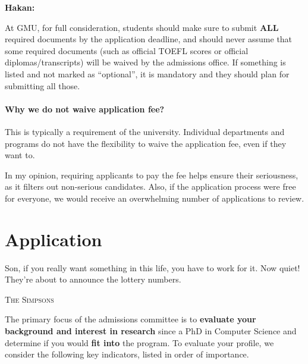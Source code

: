 \documentclass[11pt]{article}
\newenvironment{commentbox}[1][]{
\small
    \begin{mybox}
    {\small \textbf{#1}}
 }{
   \end{mybox}
}
\newcommand{\mycomment}[3][\color{blue}]{{#1{{#2}: {#3}}}}
\newcommand{\didi}[1]{\mycomment{Didier}{#1}}{}
\begin{document}

\begin{commentbox}[Hakan:]
At GMU, for full consideration, students should make sure to submit \textbf{ALL} required documents by the application deadline, and should never assume that some required documents (such as official TOEFL scores or official diplomas/transcripts) will be waived by the admissions office. If something is listed and not marked as ``optional'', it is mandatory and they should plan for submitting all those.  
\end{commentbox}
\paragraph{Why we do not waive application fee?}  This is typically a requirement of the university. Individual departments and programs do not have the flexibility to waive the application fee, even if they want to. 

In my opinion, requiring applicants to pay the fee helps ensure their seriousness, as it filters out non-serious candidates. Also, if the application process were free for everyone, we would receive an overwhelming number of applications to review.




\section{Application}\label{sec:application}

\epigraph{Son, if you really want something in this life, you have to work for it. Now quiet! They’re about to announce the lottery numbers.}{\textsc{The Simpsons}}


The primary focus of the admissions committee is to \textbf{evaluate your background and interest in research} since a PhD in Computer Science and determine if you would \textbf{fit into} the program. To evaluate your profile, we consider
the following key indicators, listed in order of importance.
\end{document}
